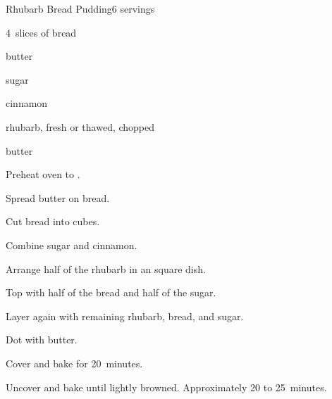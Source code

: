 \begin{recipe}{Rhubarb Bread Pudding}{}{6 servings}

\begin{ingredients}
\item 4~slices of bread
\item {} butter
\item {} sugar
\item \tp{\half} cinnamon
\item {} rhubarb, fresh or thawed, chopped
\item \Tp{1\twothird} butter
\end{ingredients}

\begin{directions}
\item Preheat oven to .
\item Spread butter on bread.
\item Cut bread into \inch{\half} cubes.
\item Combine sugar and cinnamon.
\item Arrange half of the rhubarb in an  square dish.
\item Top with half of the bread and half of the sugar.
\item Layer again with remaining rhubarb, bread, and sugar.
\item Dot with butter.
\item Cover and bake for 20~minutes.
\item Uncover and bake until lightly browned. Approximately 20 to 25~minutes.
\end{directions}

\end{recipe}
